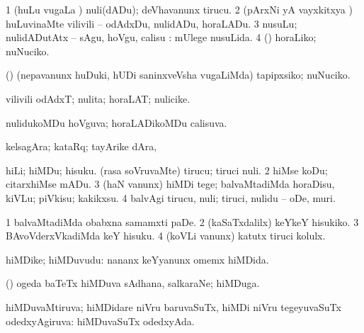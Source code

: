 {{{{{{\begin{center}
{{\noindent
\gl{\akirx}
\expl{}
\bmng
\bnum
\num{1} (huLu \mo vugaLa \vi) nuli(dADu); deVhavanunx tirucu. 
\num{2} (pArxNi yA vayxkitxya \vi) huLuvinaMte vilivili -- odAdxDu, nulidADu, horaLADu. 
\num{3} nusuLu; nulidADutAtx -- sAgu, hoVgu, calisu :  mUlege nusuLida. 
\num{4} (\rUpa) horaLiko; nuNuciko. 
\enum
\emng

\noindent
\gl{\pagu}
\expl{}
\bmng
{} (\AmA) (nepavanunx huDuki, hUDi saninxveVsha \mo vugaLiMda) tapipxsiko; nuNuciko. 
\emng
\eentry

\bentry
{} 
\gl{\nA}
\expl{}
\bmng
vilivili odAdxT; nulita; horaLAT; nulicike. 
\emng
\eentry

\bentry
{} 
\gl{\nA}
\expl{}
\bmng
{} 
\emng
\eentry

\bentry
{} 
\gl{\gu}
\expl{}
\bmng
nulidukoMDu hoVguva; horaLADikoMDu calisuva. 
\emng
\eentry

\bentry
{} 
\gl{\nA}
\expl{}
\bmng
kelsagAra; kataRq; tayArike dAra, \udA\  
\emng
\eentry

\bentry
{} 
\gl{\sakirx}
\bmng
\bnum
{} 
\banum
{} hiLi; hiMDu; hisuku. 
 (rasa soVruvaMte) tirucu; tiruci nuli. 
\eanum
\numie
\num{2} hiMse koDu; citarxhiMse mADu. 
\num{3} (haN \mo vanunx) hiMDi tege; balvaMtadiMda horaDisu, kiVLu; piVkisu; kakikxsu. 
\num{4} balvAgi tirucu, nuli; tiruci, nulidu -- oDe, muri. 
\enum
\emng

\noindent
\gl{\pagu}
\expl{}
\bmng
\bnum
\num{1}  balvaMtadiMda obabxna samamxti paDe. 
\num{2} (kaSaTxdalilx) keYkeY hisukiko. 
\num{3} BAvoVderxVkadiMda keY hisuku. 
\num{4}  (koVLi \mo vanunx) katutx tiruci kolulx. 
\enum
\emng
\eentry

\bentry
{} 
\gl{\nA}
\expl{}
\bmng
hiMDike; hiMDuvudu:  nananx keYyanunx omemx hiMDida. 
\emng
\eentry

\bentry
{} 
\gl{\nA}
\expl{}
\bmng
(\kanmu) ogeda baTeTx hiMDuva sAdhana, salkaraNe; hiMDuga. 
\emng
\eentry

\bentry
{} 
\gl{\gu}
\expl{}
\bmng
hiMDuvaMtiruva; hiMDidare niVru baruvaSuTx, hiMDi niVru tegeyuvaSuTx odedxyAgiruva:  hiMDuvaSuTx odedxyAda. 
\emng
\eentry

}}
\end{center}}}}}}}
